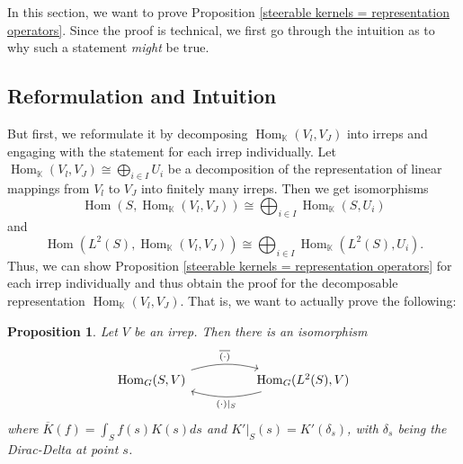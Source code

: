 \documentclass[12pt, a4paper]{article}
\theoremstyle{plain}
\newtheorem{pro}{Proposition}[section]
\theoremstyle{definition}
\theoremstyle{remark}
\newcommand{\K}{\mathds{K}}
\DeclareMathOperator{\Hom}{Hom}
\begin{document}
In this section, we want to prove Proposition \ref{steerable kernels = representation operators}. Since the proof is technical, we first go through the intuition as to why such a statement \emph{might} be true.

\subsection{Reformulation and Intuition}\label{reformulation_intuition}

But first, we reformulate it by decomposing $\Hom_{\K}(V_l, V_J)$ into irreps and engaging with the statement for each irrep individually. Let $\Hom_{\K}(V_l,V_J) \cong \bigoplus_{i \in I} U_i$ be a decomposition of the representation of linear mappings from $V_l$ to $V_J$ into finitely many irreps. Then we get isomorphisms
\begin{equation*}
\Hom(S, \Hom_{\K}(V_l, V_J)) \cong \bigoplus_{i \in I} \Hom_{\K}(S, U_i)
\end{equation*}
and
\begin{equation*}
\Hom(L^2(S), \Hom_{\K}(V_l, V_J)) \cong  \bigoplus_{i \in I}\Hom_{\K}(L^2(S), U_i).
\end{equation*}
Thus, we can show Proposition \ref{steerable kernels = representation operators} for each irrep individually and thus obtain the proof for the decomposable representation $\Hom_{\K}(V_l, V_J)$. That is, we want to actually prove the following:

\begin{pro}\label{altered_prop}
Let $V$ be an irrep. Then there is an isomorphism 
\begin{equation*}
\begin{tikzcd}
\Hom_G(S, V) \ar[rr, bend left = 15, "\overline{(\cdot)}"] & & \Hom_G(L^2(S), V) \ar[ll, bend left = 15, "(\cdot)|_{S}"]
\end{tikzcd}
\end{equation*}
where $\overline{K}(f) = \int_{S} f(s) K(s) ds$ and $K'|_S(s) = K'(\delta_s)$, with $\delta_s$ being the Dirac-Delta at point $s$.
\end{pro}
\end{document}
